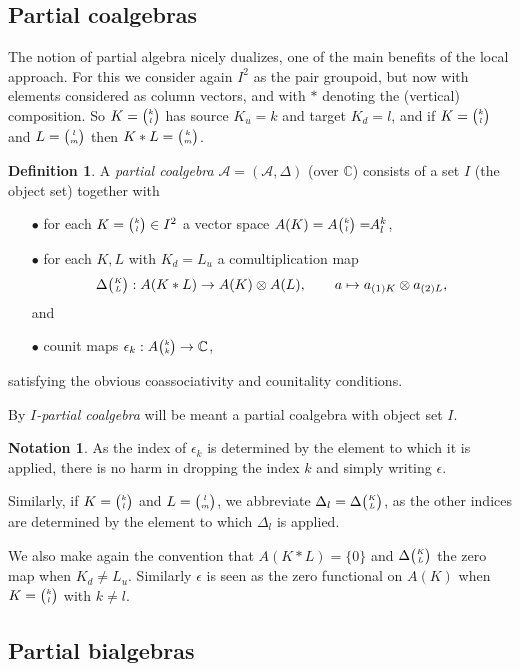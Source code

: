 \documentclass[10pt]{article}
\newcommand{\C}{\mathbb{C}}
\newcommand{\Grt}[3]{#1{\tiny {\begin{pmatrix} #2\\#3\end{pmatrix}}}}
\newcommand{\GrRA}[3]{#1^{#2}_{#3}} %
\newcommand{\Grru}[2]{{\tiny \begin{pmatrix} #1 \\ #2\end{pmatrix}}}
\newcommand{\bmult}{*}
\theoremstyle{definition}
\newtheorem{Def}[Theorem]{Definition}
\newtheorem{Not}[Theorem]{Notation}
\numberwithin{equation}{section}
\begin{document}
\subsection{Partial coalgebras}

The notion of partial algebra nicely dualizes, one of the main benefits of the local approach. For this we consider again $I^2$ as the pair groupoid, but now with elements considered as column vectors, and with $\bmult$ denoting the (vertical) composition. So $K=\Grt{}{k}{l}$ has source $K_u = k$ and target $K_d = l$, and if $K=\Grt{}{k}{l}$ and $L=\Grt{}{l}{m}$ then $K\bmult L = \Grt{}{k}{m}$.

\begin{Def} A \emph{partial coalgebra} $\mathscr{A}=(\mathscr{A},\Delta)$ (over $\C$) consists of a set $I$ (the object set) together with 
\begin{itemize}
\item[$\bullet$] for each $K=\Grru{k}{l}\in I^2$ a vector space $A(K) = \Grt{A}{k}{l}=\!\!\GrRA{A}{k}{l}$,
\item[$\bullet$] for each $K,L$ with $K_d = L_u$ a comultiplication map \[\Grt{\Delta}{K}{L}:A(K*L)\rightarrow A(K)\otimes A(L),\qquad a \mapsto a_{(1)K}\otimes a_{(2)L},\] and 
\item[$\bullet$] counit maps $\epsilon_k:\Grt{A}{k}{k}\rightarrow \C$,
\end{itemize} 
satisfying the obvious coassociativity and counitality conditions.

By \emph{$I$-partial coalgebra} will be meant a partial coalgebra with object set $I$.
\end{Def}

\begin{Not}\label{NotCom} As the index of $\epsilon_k$ is determined by the element to which it is applied, there is no harm in dropping the index $k$ and simply writing $\epsilon$.

Similarly, if $K = \Grt{}{k}{l}$ and $L = \Grt{}{l}{m}$, we abbreviate $\Delta_l = \Grt{\Delta}{K}{L}$, as the other indices are determined by the element to which $\Delta_l$ is applied.
\end{Not}

We also make again the convention that $A(K*L)=\{0\}$ and $\Grt{\Delta}{K}{L}$ the zero map when $K_d \neq L_u$. Similarly $\epsilon$ is seen as the zero functional on $A(K)$ when $K=\Grt{}{k}{l}$ with $k\neq l$. 

\subsection{Partial bialgebras}
\end{document}

